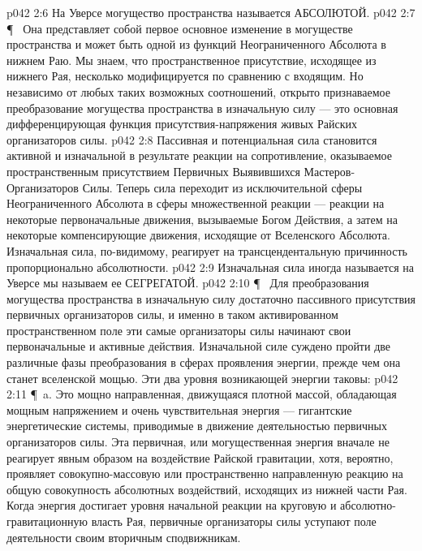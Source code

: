 \vs p042 2:6 На Уверсе могущество пространства называется АБСОЛЮТОЙ.
\vs p042 2:7 \P\ \bibnobreakspace {} Она представляет собой первое основное изменение в могуществе пространства и может быть одной из функций Неограниченного Абсолюта в нижнем Раю. Мы знаем, что пространственное присутствие, исходящее из нижнего Рая, несколько модифицируется по сравнению с входящим. Но независимо от любых таких возможных соотношений, открыто признаваемое преобразование могущества пространства в изначальную силу --- это основная дифференцирующая функция присутствия\hyp{}напряжения живых Райских организаторов силы.
\vs p042 2:8 Пассивная и потенциальная сила становится активной и изначальной в результате реакции на сопротивление, оказываемое пространственным присутствием Первичных Выявившихся Мастеров\hyp{}Организаторов Силы. Теперь сила переходит из исключительной сферы Неограниченного Абсолюта в сферы множественной реакции --- реакции на некоторые первоначальные движения, вызываемые Богом Действия, а затем на некоторые компенсирующие движения, исходящие от Вселенского Абсолюта. Изначальная сила, по\hyp{}видимому, реагирует на трансцендентальную причинность пропорционально абсолютности.
\vs p042 2:9 Изначальная сила иногда называется  на Уверсе мы называем ее СЕГРЕГАТОЙ.
\vs p042 2:10 \P\ \bibnobreakspace {} Для преобразования могущества пространства в изначальную силу достаточно пассивного присутствия первичных организаторов силы, и именно в таком активированном пространственном поле эти самые организаторы силы начинают свои первоначальные и активные действия. Изначальной силе суждено пройти две различные фазы преобразования в сферах проявления энергии, прежде чем она станет вселенской мощью. Эти два уровня возникающей энергии таковы:
\vs p042 2:11 \P\ a.  Это мощно направленная, движущаяся плотной массой, обладающая мощным напряжением и очень чувствительная энергия --- гигантские энергетические системы, приводимые в движение деятельностью первичных организаторов силы. Эта первичная, или могущественная энергия вначале не реагирует явным образом на воздействие Райской гравитации, хотя, вероятно, проявляет совокупно\hyp{}массовую или пространственно направленную реакцию на общую совокупность абсолютных воздействий, исходящих из нижней части Рая. Когда энергия достигает уровня начальной реакции на круговую и абсолютно\hyp{}гравитационную власть Рая, первичные организаторы силы уступают поле деятельности своим вторичным сподвижникам.
